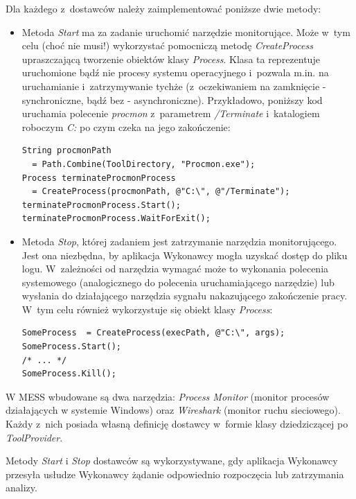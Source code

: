 \documentclass[a4paper,12pt,oneside]{article}
\begin{document}
	Dla każdego z~dostawców należy zaimplementować poniższe dwie metody:
	\begin{itemize}
		\item Metoda \textit{Start} ma za zadanie uruchomić narzędzie monitorujące. Może w~tym celu (choć nie musi!) wykorzystać pomocniczą metodę \textit{CreateProcess} upraszczającą tworzenie obiektów klasy \textit{Process}. Klasa ta reprezentuje uruchomione bądź nie procesy systemu operacyjnego i~pozwala m.in. na uruchamianie i~zatrzymywanie tychże (z~oczekiwaniem na zamknięcie - synchroniczne, bądź bez - asynchroniczne). Przykładowo, poniższy kod uruchamia polecenie \textit{procmon} z~parametrem \textit{/Terminate} i~katalogiem roboczym \textit{C:} po czym czeka na jego zakończenie:

		\begin{lstlisting}[language={[Sharp]C}]
String procmonPath 
  = Path.Combine(ToolDirectory, "Procmon.exe");
Process terminateProcmonProcess 
  = CreateProcess(procmonPath, @"C:\", @"/Terminate");
terminateProcmonProcess.Start();
terminateProcmonProcess.WaitForExit();
		\end{lstlisting}		

		\item Metoda \textit{Stop}, której zadaniem jest zatrzymanie narzędzia monitorującego. Jest ona niezbędna, by aplikacja Wykonawcy mogła uzyskać dostęp do pliku logu. W~zależności od narzędzia wymagać może to wykonania polecenia systemowego (analogicznego do polecenia uruchamiającego narzędzie) lub wysłania do działającego narzędzia sygnału nakazującego zakończenie pracy. W~tym celu również wykorzystuje się obiekt klasy \textit{Process}:
		\begin{lstlisting}[language={[Sharp]C}]
SomeProcess  = CreateProcess(execPath, @"C:\", args);
SomeProcess.Start();
/* ... */		
SomeProcess.Kill();
		\end{lstlisting}		
		
	\end{itemize}
	
	W MESS wbudowane są dwa narzędzia: \textit{Process Monitor} (monitor procesów działających w systemie Windows) oraz \textit{Wireshark} (monitor ruchu sieciowego). Każdy z~nich posiada własną definicję dostawcy w~formie klasy dziedziczącej po \textit{ToolProvider}. 
	
	Metody \textit{Start} i \textit{Stop} dostawców są wykorzystywane, gdy aplikacja Wykonawcy przesyła usłudze Wykonawcy żądanie odpowiednio rozpoczęcia lub zatrzymania analizy.
	
\end{document}
